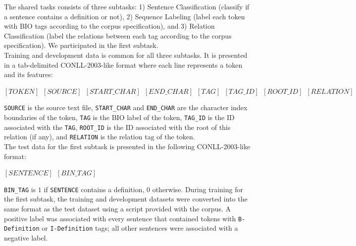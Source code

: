 \documentclass[11pt]{article}
\begin{document}
The shared tasks consists of three subtasks: 1) Sentence Classification (classify if a sentence contains a definition or not),
2) Sequence Labeling (label each token with BIO tags according to the corpus specification), and 3) Relation Classification
(label the relations between each tag according to the corpus specification). We participated in the first subtask.\\

Training and development data is common for all three subtasks. It is presented in a tab-delimited CONLL-2003-like
 \cite{sang2003introduction} format where each line represents a token and its features:\\

\begin{small}
  \centerline{\texttt{$[TOKEN]\hspace{6pt}[SOURCE]\hspace{6pt}[START\_CHAR]\hspace{6pt}[END\_CHAR]\hspace{6pt}
  [TAG]\hspace{6pt}[TAG\_ID]\hspace{6pt}[ROOT\_ID]\hspace{6pt}[RELATION]$}}
\end{small}
\smallskip

{\small\texttt{SOURCE}} is the source text file, {\small\texttt{START\_CHAR}} and {\small\texttt{END\_CHAR}} are the character index
boundaries of the token, {\small\texttt{TAG}} is the BIO label of the token, {\small\texttt{TAG\_ID}} is the ID
associated with the {\small\texttt{TAG}}, {\small\texttt{ROOT\_ID}} is the ID associated with the root of this relation
(if any), and {\small\texttt{RELATION}} is the relation tag of the token.\\

The test data for the first subtask is presented in the following CONLL-2003-like format:\\

\begin{small}
  \centerline{\texttt{$[SENTENCE]\hspace{6pt}[BIN\_TAG]$}}
\end{small}
\smallskip

{\small\texttt{BIN\_TAG}} is $1$ if {\small\texttt{SENTENCE}} contains a definition, $0$ otherwise. During training for the first subtask, the training and
development datasets were converted into the same format as the test dataset using a script provided with the corpus. A positive
label was associated with every sentence that contained tokens with {\small\texttt{B-Definition}} or {\small\texttt{I-Definition}} tags;
all other sentences were associated with a negative label.
\end{document}
